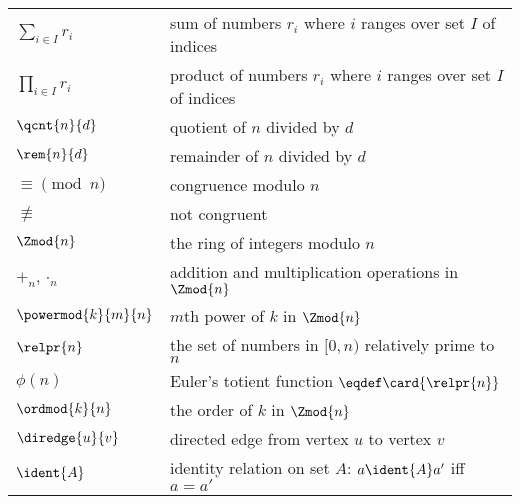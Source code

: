 \begin{center}
\begin{tabular}{ll}
$\sum_{i \in I} r_i$ & sum of numbers $r_i$ where $i$ ranges over
set $I$ of indices\\
$\prod_{i \in I} r_i$ & product of numbers $r_i$ where $i$ ranges over
set $I$ of indices\\
$\qcnt{n}{d}$  & quotient of $n$ divided by $d$\\
$\rem{n}{d}$   & remainder of $n$ divided by $d$\\
$\equiv \pmod{n}$ & congruence modulo $n$\\
$\not\equiv$   & not congruent\\
$\Zmod{n}$     & the ring of integers modulo $n$\\
$+_n, \cdot_n$ & addition and multiplication operations in $\Zmod{n}$\\
$\powermod{k}{m}{n}$  & $m$th power of $k$ in $\Zmod{n}$\\
$\relpr{n}$    & the set of numbers in $[0,n)$ relatively prime to $n$\\
$\phi(n)$      & Euler's totient function $\eqdef \card{\relpr{n}}$\\
$\ordmod{k}{n}$ & the order of $k$ in $\Zmod{n}$\\
$\diredge{u}{v}$ & directed edge from vertex $u$ to vertex $v$\\
$\ident{A}$    & identity relation on set $A$: $a \ident{A} a'$ iff $a = a'$
\end{tabular}
\end{center}


